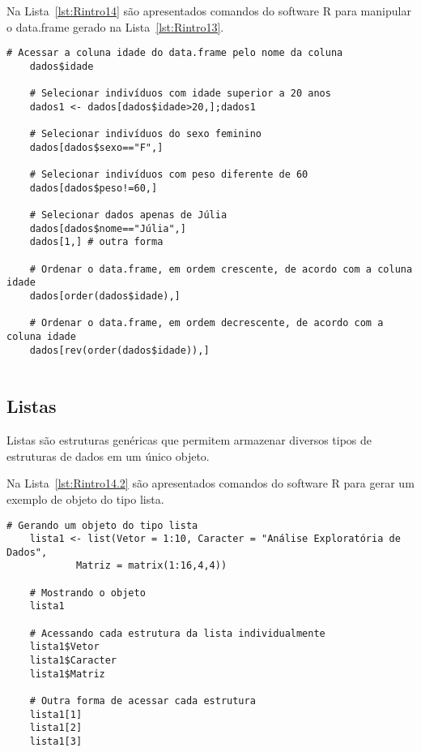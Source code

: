 \documentclass[11pt,fleqn]{book} %
\begin{document}
Na Lista~\ref{lst:Rintro14} são apresentados comandos do software R para manipular o data.frame gerado na Lista~\ref{lst:Rintro13}. \\


\begin{scriptsize}
	\estiloR
	\begin{lstlisting}[caption={Comandos do software R}, label=lst:Rintro14]
	# Acessar a coluna idade do data.frame pelo nome da coluna
	dados$idade	
	
	# Selecionar indivíduos com idade superior a 20 anos
	dados1 <- dados[dados$idade>20,];dados1
	
	# Selecionar indivíduos do sexo feminino
	dados[dados$sexo=="F",]
	
	# Selecionar indivíduos com peso diferente de 60
	dados[dados$peso!=60,]
	
	# Selecionar dados apenas de Júlia
	dados[dados$nome=="Júlia",]
	dados[1,] # outra forma
	
	# Ordenar o data.frame, em ordem crescente, de acordo com a coluna idade
	dados[order(dados$idade),]
	
	# Ordenar o data.frame, em ordem decrescente, de acordo com a coluna idade
	dados[rev(order(dados$idade)),]
		
	\end{lstlisting}
\end{scriptsize}



\subsection{Listas}

Listas são estruturas genéricas que permitem armazenar diversos tipos de estruturas de dados em um único objeto.


Na Lista~\ref{lst:Rintro14.2} são apresentados comandos do software R para gerar um exemplo de objeto do tipo lista. \\


\begin{scriptsize}
	\estiloR
	\begin{lstlisting}[caption={Comandos do software R}, label=lst:Rintro14.2]
	# Gerando um objeto do tipo lista
	lista1 <- list(Vetor = 1:10, Caracter = "Análise Exploratória de Dados", 
			Matriz = matrix(1:16,4,4))
	
	# Mostrando o objeto
	lista1		
	
	# Acessando cada estrutura da lista individualmente
	lista1$Vetor
	lista1$Caracter
	lista1$Matriz	
	
	# Outra forma de acessar cada estrutura
	lista1[1]
	lista1[2]
	lista1[3]	
		
	\end{lstlisting}
\end{scriptsize}
\end{document}
